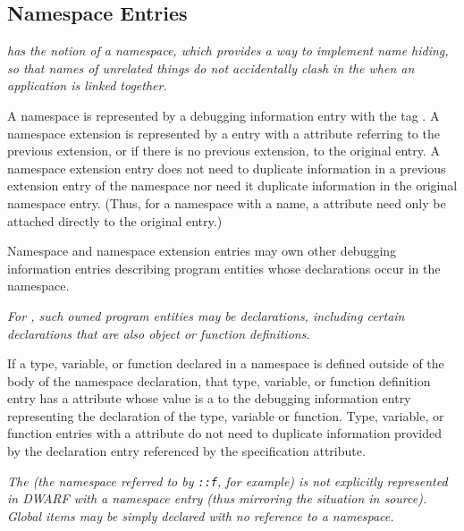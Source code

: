 \subsection{Namespace Entries}
\label{chap:namespaceentries}
\textit{ has the notion of a namespace, which provides a way to
implement name hiding, so that names of unrelated things
do not accidentally clash in the 
 when an
application is linked together.}

A namespace is represented by a debugging information entry
with the 
tag \DWTAGnamespaceTARG. 
A namespace extension is
\hypertarget{chap:DWATextensionpreviousnamespaceextensionororiginalnamespace}{}
represented by a 
\DWTAGnamespace{} entry 
with 
a 
\DWATextension{}
attribute referring to the previous extension, or if there
is no previous extension, to the original 
\DWTAGnamespace{}
entry. A namespace extension entry does not need to duplicate
information in a previous extension entry of the namespace
nor need it duplicate information in the original namespace
entry. (Thus, for a namespace with a name, 
a \DWATname{} attribute 
need only be attached directly to the original
\DWTAGnamespace{} entry.)

Namespace and namespace extension entries may own 
other
debugging information entries describing program entities
whose declarations occur in the namespace.

\textit{For , such 
owned program entities may be declarations,
including certain declarations that are also object or
function definitions.}

If a type, variable, or function declared in a namespace is
defined outside of the body of the namespace declaration,
that type, variable, or function definition entry has a
\DWATspecification{} attribute 
whose value is a  to the
debugging information entry representing the declaration of
the type, variable or function. Type, variable, or function
entries with a 
\DWATspecification{} attribute 
do not need
to duplicate information provided by the declaration entry
referenced by the specification attribute.

\textit{The  
(the 
namespace 
referred to by
\texttt{::f}, for example) is not explicitly represented in
DWARF with a namespace entry (thus mirroring the situation
in  source).  
Global items may be simply declared with no
reference to a namespace.}


